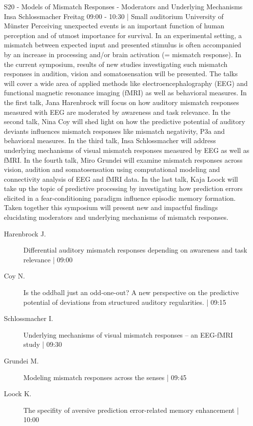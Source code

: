 
            \begin{symposium}
            {S20 - Models of Mismatch Responses - Moderators and Underlying Mechanisms}
            {Insa Schlossmacher}
            {Freitag 09:00 - 10:30 | Small auditorium}
            {University of Münster}
            Perceiving unexpected events is an important function of human perception and of utmost importance for survival. In an experimental setting, a mismatch between expected input and presented stimulus is often accompanied by an increase in processing and/or brain activation (= mismatch response). In the current symposium, results of new studies investigating such mismatch responses in audition, vision and somatosensation will be presented. The talks will cover a wide area of applied methods like electroencephalography (EEG) and functional magnetic resonance imaging (fMRI) as well as behavioral measures. In the first talk, Jana Harenbrock will focus on how auditory mismatch responses measured with EEG are moderated by awareness and task relevance. In the second talk, Nina Coy will shed light on how the predictive potential of auditory deviants influences mismatch responses like mismatch negativity, P3a and behavioral measures. In the third talk, Insa Schlossmacher will address underlying mechanisms of visual mismatch responses measured by EEG as well as fMRI. In the fourth talk, Miro Grundei will examine mismatch responses across vision, audition and somatosensation using computational modeling and connectivity analysis of EEG and fMRI data. In the last talk, Kaja Loock will take up the topic of predictive processing by investigating how prediction errors elicited in a fear-conditioning paradigm influence episodic memory formation. Taken together this symposium will present new and impactful findings elucidating moderators and underlying mechanisms of mismatch responses.
            \begin{description}    
            
                \item [ Harenbrock J.] Differential auditory mismatch responses depending on awareness and task relevance \textcolor{mygray}{ | 09:00}    
                
                \item [ Coy N.] Is the oddball just an odd-one-out? A new perspective on the predictive potential of deviations from structured auditory regularities. \textcolor{mygray}{ | 09:15}    
                
                \item [ Schlossmacher I.] Underlying mechanisms of visual mismatch responses – an EEG-fMRI study \textcolor{mygray}{ | 09:30}    
                
                \item [ Grundei M.] Modeling mismatch responses across the senses \textcolor{mygray}{ | 09:45}    
                
                \item [ Loock K.] The specifity of aversive prediction error-related memory enhancement \textcolor{mygray}{ | 10:00}    
                
            \end{description} 
            \end{symposium}
            